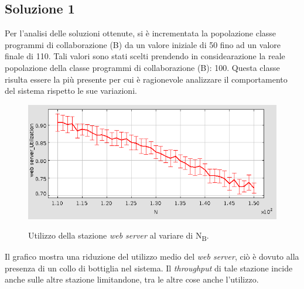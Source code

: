 \documentclass[../main.tex]{subfiles}
\begin{document}
    \subsection{Soluzione 1}\label{subsec:soluzione 1}
    Per l'analisi delle soluzioni ottenute, si è incrementata la popolazione classe programmi di collaborazione (B) da
    un valore iniziale di 50 fino ad un valore finale di 110. Tali valori sono stati scelti prendendo in considearazione
    la reale popolazione della classe programmi di collaborazione (B): 100.
    Questa classe risulta essere la più presente per cui è ragionevole analizzare il comportamento del sistema rispetto
    le sue variazioni.
    \begin{figure}[H]
        \centering
        \includegraphics[scale = 0.6]{assets/u_ws_174.png}\\
        \caption[\textit{Utilizzo} della stazione \textit{web server}]{Utilizzo della stazione \textit{web server} al
        variare di N\textsubscript{B}.}
        \label{fig:utilizzo-ws}
    \end{figure}
    Il grafico mostra una riduzione del utilizzo medio del \textit{web server}, ciò è dovuto alla presenza di un collo
    di bottiglia nel sistema. Il \textit{throughput} di tale stazione incide anche sulle altre stazione limitandone, tra
    le altre cose anche l'utilizzo.
\end{document}
